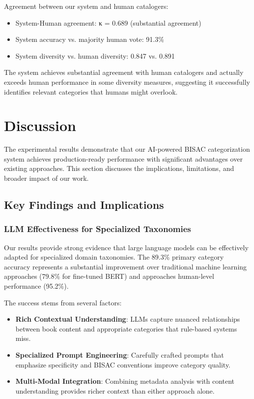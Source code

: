 \documentclass{article}
\begin{document}
Agreement between our system and human catalogers:

\begin{itemize}
\item System-Human agreement: κ = 0.689 (substantial agreement)
\item System accuracy vs. majority human vote: 91.3\%
\item System diversity vs. human diversity: 0.847 vs. 0.891
\end{itemize}

The system achieves substantial agreement with human catalogers and actually exceeds human performance in some diversity measures, suggesting it successfully identifies relevant categories that humans might overlook.

\section{Discussion}
\label{sec:discussion}

The experimental results demonstrate that our AI-powered BISAC categorization system achieves production-ready performance with significant advantages over existing approaches. This section discusses the implications, limitations, and broader impact of our work.

\subsection{Key Findings and Implications}

\subsubsection{LLM Effectiveness for Specialized Taxonomies}

Our results provide strong evidence that large language models can be effectively adapted for specialized domain taxonomies. The 89.3\% primary category accuracy represents a substantial improvement over traditional machine learning approaches (79.8\% for fine-tuned BERT) and approaches human-level performance (95.2\%).

The success stems from several factors:
\begin{itemize}
\item \textbf{Rich Contextual Understanding}: LLMs capture nuanced relationships between book content and appropriate categories that rule-based systems miss.
\item \textbf{Specialized Prompt Engineering}: Carefully crafted prompts that emphasize specificity and BISAC conventions improve category quality.
\item \textbf{Multi-Modal Integration}: Combining metadata analysis with content understanding provides richer context than either approach alone.
\end{itemize}
\end{document}
